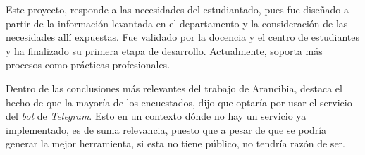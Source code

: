 \documentclass[guia]{upropuesta}
\begin{document}
    \par Este proyecto, responde a las necesidades del estudiantado, pues fue diseñado a partir de la información levantada en el departamento y la consideración de las necesidades allí expuestas. Fue validado por la docencia y el centro de estudiantes y ha finalizado su primera etapa de desarrollo. Actualmente, soporta más procesos como prácticas profesionales.
    \par Dentro de las conclusiones más relevantes del trabajo de Arancibia, destaca el hecho de que la mayoría de los encuestados, dijo que optaría por usar el servicio del \textit{bot} de \textit{Telegram}. Esto en un contexto dónde no hay un servicio ya implementado, es de suma relevancia, puesto que a pesar de que se podría generar la mejor herramienta, si esta no tiene público, no tendría razón de ser.

    
    
    

\newpage
\end{document}
